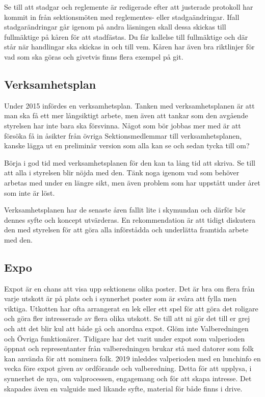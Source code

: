 \documentclass[10pt]{article}
\begin{document}
    Se till att stadgar och reglemente är redigerade efter att justerade protokoll har kommit in från sektionsmöten med reglementes- eller stadgaändringar. Ifall stadgarändringar går igenom på andra läsningen skall dessa skickas till fullmäktige på kåren för att stadfästas. Du får kallelse till fullmäktige och där står när handlingar ska skickas in och till vem. Kåren har även bra riktlinjer för vad som ska göras och givetvis finns flera exempel på git.
    
    \subsection{Verksamhetsplan}
    
    Under 2015 infördes en verksamhetsplan. Tanken med verksamhetsplanen är att man ska få ett mer långsiktigt arbete, men även att tankar som den avgående styrelsen har inte bara ska försvinna. Något som bör jobbas mer med är att försöka få in åsikter från övriga Sektionsmedlemmar till verksamhetsplanen, kanske lägga ut en preliminär version som alla kan se och sedan tycka till om?
    
    Börja i god tid med verksamhetsplanen för den kan ta lång tid att skriva. Se till att alla i styrelsen blir nöjda med den. Tänk noga igenom vad som behöver arbetas med under en längre sikt, men även problem som har uppstått under året som inte är löst.
    
    Verksamhetsplanen har de senaste åren fallit lite i skymundan och därför bör dennes syfte och koncept utvärderas. En rekommendation är att tidigt diskutera den med styrelsen för att göra alla införstådda och underlätta framtida arbete med den.
    
    \subsection{Expo}
    
    Expot är en chans att visa upp sektionens olika poster. Det är bra om flera från varje utskott är på plats och i synnerhet poster som är svåra att fylla men viktiga. Utkotten har ofta arrangerat en lek eller ett spel för att göra det roligare och göra fler intresserade av flera olika utskott. Se till att ni gör det till er grej och att det blir kul att både gå och anordna expot. Glöm inte Valberedningen och Övriga funktionärer. Tidigare har det varit under expot som valperioden öppnat och representanter från valberedningen brukar stå med datorer som folk kan använda för att nominera folk. 2019 inleddes valperioden med en lunchinfo en vecka före expot given av ordförande och valberedning. Detta för att upplysa, i synnerhet de nya, om valprocessen, engagemang och för att skapa intresse. Det skapades även en valguide med likande syfte, material för både finns i drive.
    
\end{document}
